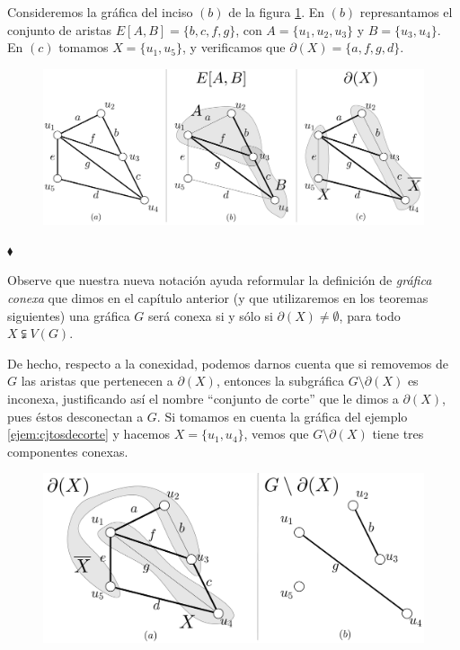 \begin{ejem} \label{ejem:cjtosdecorte}
Consideremos la gráfica del inciso $(b)$ de la figura \ref{fig:cjtosdecorte}. En $(b)$ represantamos el conjunto de aristas $E[A,B] = \{b,c,f,g\}$, con $A=\{u_{1}, u_{2}, u_{3}\}$ y $B=\{u_{3},u_{4}\}$. En $(c)$ tomamos $X =\{u_{1},u_{5}\}$, y verificamos que $\partial(X) = \{a,f,g,d\}$.
\begin{figure}[H]
    \centering
    \includegraphics[scale=0.2]{img/imgchapter2/cjtosdecorte.jpg}
    \caption{}
    \label{fig:cjtosdecorte}
\end{figure}

\hfill $\blacklozenge$
\end{ejem}
Observe que nuestra nueva notación ayuda reformular la definición de \textit{gráfica conexa} que dimos en el capítulo anterior (y que utilizaremos en los teoremas siguientes) una gráfica $G$ será conexa si y sólo si $\partial(X) \neq \emptyset$, para todo $X \subsetneqq V(G)$. 

De hecho, respecto a la conexidad, podemos darnos cuenta que si removemos de $G$ las aristas que pertenecen a $\partial(X)$, entonces la subgráfica $G\setminus \partial(X)$ es inconexa, justificando así el nombre ``conjunto de corte'' que le dimos a $\partial(X)$, pues éstos desconectan a $G$. Si tomamos en cuenta la gráfica del ejemplo \ref{ejem:cjtosdecorte} y hacemos $X=\{u_{1},u_{4}\}$, vemos que $G\setminus \partial(X)$ tiene tres componentes conexas.

\begin{figure}[H]
     \centering
     \includegraphics[scale=0.2]{img/imgchapter2/cortescompconexas.jpg}
     \caption{}
     \label{fig:cortescompconexas}
\end{figure}

